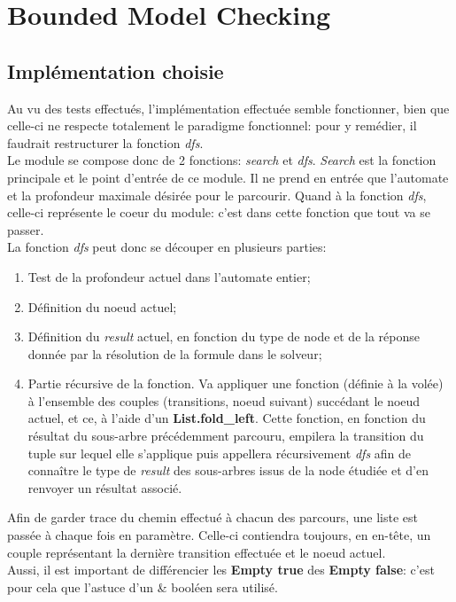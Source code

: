 \section{Bounded Model Checking}

\subsection{Implémentation choisie}

Au vu des tests effectués, l'implémentation effectuée semble fonctionner, bien que celle-ci ne respecte totalement le paradigme fonctionnel: pour y remédier, il faudrait restructurer la fonction \textit{dfs}.\\

Le module se compose donc de 2 fonctions: \textit{search} et \textit{dfs}. \textit{Search} est la fonction principale et le point d'entrée de ce module. Il ne prend en entrée que l'automate et la profondeur maximale désirée pour le parcourir. Quand à la fonction \textit{dfs}, celle-ci représente le coeur du module: c'est dans cette fonction que tout va se passer.\\

La fonction \textit{dfs} peut donc se découper en plusieurs parties:

\begin{enumerate}
\item{Test de la profondeur actuel dans l'automate entier;}
\item{Définition du noeud actuel;}
\item{Définition du \textit{result} actuel, en fonction du type de node et de la réponse donnée par la résolution de la formule dans le solveur;}
\item{Partie récursive de la fonction. Va appliquer une fonction (définie à la volée) à l'ensemble des couples (transitions, noeud suivant) succédant le noeud actuel, et ce, à l'aide d'un \textbf{List.fold\_left}. Cette fonction, en fonction du résultat du sous-arbre précédemment parcouru, empilera la transition du tuple sur lequel elle s'applique puis appellera récursivement \textit{dfs} afin de connaître le type de \textit{result} des sous-arbres issus de la node étudiée et d'en renvoyer un résultat associé.\\}
\end{enumerate}

Afin de garder trace du chemin effectué à chacun des parcours, une liste est passée à chaque fois en paramètre. Celle-ci contiendra toujours, en en-tête, un couple représentant la dernière transition effectuée et le noeud actuel.\\
Aussi, il est important de différencier les \textbf{Empty true} des \textbf{Empty false}: c'est pour cela que l'astuce d'un \& booléen sera utilisé.


